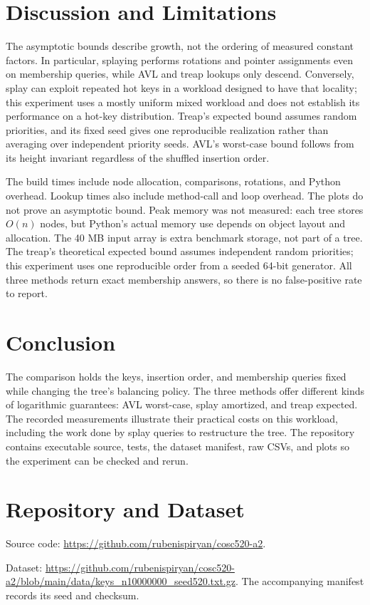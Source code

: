 \documentclass[acmsmall,nonacm]{acmart}
\begin{document}
\section{Discussion and Limitations}
The asymptotic bounds describe growth, not the ordering of measured constant factors. In particular, splaying performs rotations and pointer assignments even on membership queries, while AVL and treap lookups only descend. Conversely, splay can exploit repeated hot keys in a workload designed to have that locality; this experiment uses a mostly uniform mixed workload and does not establish its performance on a hot-key distribution. Treap's expected bound assumes random priorities, and its fixed seed gives one reproducible realization rather than averaging over independent priority seeds. AVL's worst-case bound follows from its height invariant regardless of the shuffled insertion order.

The build times include node allocation, comparisons, rotations, and Python overhead. Lookup times also include method-call and loop overhead. The plots do not prove an asymptotic bound. Peak memory was not measured: each tree stores $O(n)$ nodes, but Python's actual memory use depends on object layout and allocation. The 40 MB input array is extra benchmark storage, not part of a tree. The treap's theoretical expected bound assumes independent random priorities; this experiment uses one reproducible order from a seeded 64-bit generator. All three methods return exact membership answers, so there is no false-positive rate to report.

\section{Conclusion}
The comparison holds the keys, insertion order, and membership queries fixed while changing the tree's balancing policy. The three methods offer different kinds of logarithmic guarantees: AVL worst-case, splay amortized, and treap expected. The recorded measurements illustrate their practical costs on this workload, including the work done by splay queries to restructure the tree. The repository contains executable source, tests, the dataset manifest, raw CSVs, and plots so the experiment can be checked and rerun.

\section*{Repository and Dataset}
Source code: \url{https://github.com/rubenispiryan/cosc520-a2}.\par
Dataset: \url{https://github.com/rubenispiryan/cosc520-a2/blob/main/data/keys_n10000000_seed520.txt.gz}. The accompanying manifest records its seed and checksum.\par
\end{document}
